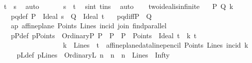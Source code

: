 \begin{isabellebody}
\ {\isacartoucheopen}t\ {\isasymsubseteq}\ s{\isacartoucheclose}\ \isamarkupfalse%
\ auto\isanewline
\ \ \isamarkupfalse%
\isanewline
\ \ \isamarkupfalse%
\ {\isachardoublequoteopen}s\ {\isacharequal}{\kern0pt}\ t{\isachardoublequoteclose}\ \isamarkupfalse%
\ s{\isacharunderscore}{\kern0pt}in{\isacharunderscore}{\kern0pt}t\ t{\isacharunderscore}{\kern0pt}in{\isacharunderscore}{\kern0pt}s\ \isamarkupfalse%
\ auto\isanewline
{}\isamarkupfalse%
%
\endisatagproof
{\isafoldproof}%
%
\isadelimproof
\isanewline
%
\endisadelimproof
\ \ \isanewline
{}\isamarkupfalse%
\ two{\isacharunderscore}{\kern0pt}ideal{\isacharunderscore}{\kern0pt}is{\isacharunderscore}{\kern0pt}infinite{\isacharcolon}{\kern0pt}\isanewline
\ \ \ P\ Q\ k\isanewline
\ \ \ pq{\isacharunderscore}{\kern0pt}def{\isacharcolon}{\kern0pt}\ {\isachardoublequoteopen}P\ {\isacharequal}{\kern0pt}\ Ideal\ s\ {\isasymand}\ Q\ {\isacharequal}{\kern0pt}\ Ideal\ t{\isachardoublequoteclose}\isanewline
\ \ \ pq{\isacharunderscore}{\kern0pt}diff{\isacharcolon}{\kern0pt}{\isachardoublequoteopen}P\ {\isasymnoteq}\ Q{\isachardoublequoteclose}\isanewline
\ \ \ ap{\isacharcolon}{\kern0pt}\ {\isachardoublequoteopen}affine{\isacharunderscore}{\kern0pt}plane\ Points\ Lines\ incid\ join\ find{\isacharunderscore}{\kern0pt}parallel{\isachardoublequoteclose}\isanewline
\ \ \ pPdef{\isacharcolon}{\kern0pt}\ {\isachardoublequoteopen}pPoints\ {\isasymequiv}\ {\isacharbraceleft}{\kern0pt}OrdinaryP\ P\ {\isacharbar}{\kern0pt}\ P\ {\isachardot}{\kern0pt}\ {\isacharparenleft}{\kern0pt}P\ {\isasymin}\ Points{\isacharparenright}{\kern0pt}{\isacharbraceright}{\kern0pt}\ {\isasymunion}\ {\isacharbraceleft}{\kern0pt}Ideal\ t\ {\isacharbar}{\kern0pt}\ k\ t\ {\isachardot}{\kern0pt}\ \isanewline
\ \ \ \ \ \ \ \ \ \ \ \ \ \ \ \ \ \ {\isacharparenleft}{\kern0pt}{\isacharparenleft}{\kern0pt}k\ {\isasymin}\ Lines{\isacharparenright}{\kern0pt}\ {\isasymand}\ {\isacharparenleft}{\kern0pt}t\ {\isacharequal}{\kern0pt}\ affine{\isacharunderscore}{\kern0pt}plane{\isacharunderscore}{\kern0pt}data{\isachardot}{\kern0pt}line{\isacharunderscore}{\kern0pt}pencil\ Points\ Lines\ {\isacharparenleft}{\kern0pt}incid{\isacharparenright}{\kern0pt}\ k{\isacharparenright}{\kern0pt}\ {\isacharparenright}{\kern0pt}{\isacharbraceright}{\kern0pt}{\isachardoublequoteclose}\isanewline
\ \ \ pLdef{\isacharcolon}{\kern0pt}\ {\isachardoublequoteopen}pLines\ {\isasymequiv}\ {\isacharbraceleft}{\kern0pt}OrdinaryL\ n\ {\isacharbar}{\kern0pt}\ n\ {\isachardot}{\kern0pt}\ {\isacharparenleft}{\kern0pt}n\ {\isasymin}\ Lines{\isacharparenright}{\kern0pt}{\isacharbraceright}{\kern0pt}\ {\isasymunion}\ {\isacharbraceleft}{\kern0pt}Infty{\isacharbraceright}{\kern0pt}{\isachardoublequoteclose}\isanewline

\end{isabellebody}
